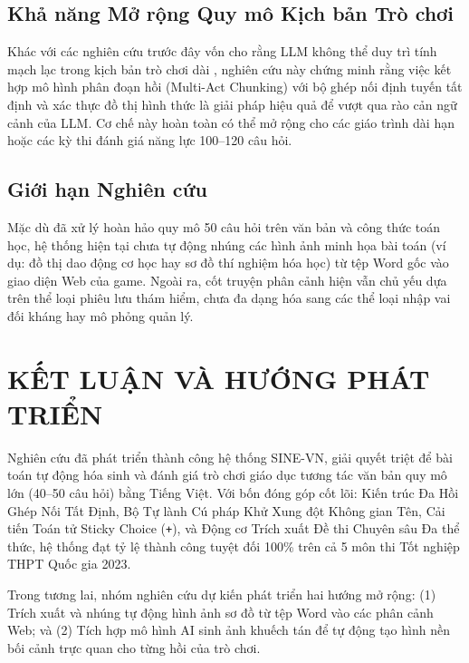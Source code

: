 \documentclass[conference]{IEEEtran}
\begin{document}
\subsection{Khả năng Mở rộng Quy mô Kịch bản Trò chơi}
Khác với các nghiên cứu trước đây vốn cho rằng LLM không thể duy trì tính mạch lạc trong kịch bản trò chơi dài \cite{leandro2024, farrell2025}, nghiên cứu này chứng minh rằng việc kết hợp mô hình phân đoạn hồi (Multi-Act Chunking) với bộ ghép nối định tuyến tất định và xác thực đồ thị hình thức là giải pháp hiệu quả để vượt qua rào cản ngữ cảnh của LLM. Cơ chế này hoàn toàn có thể mở rộng cho các giáo trình dài hạn hoặc các kỳ thi đánh giá năng lực 100--120 câu hỏi.

\subsection{Giới hạn Nghiên cứu}
Mặc dù đã xử lý hoàn hảo quy mô 50 câu hỏi trên văn bản và công thức toán học, hệ thống hiện tại chưa tự động nhúng các hình ảnh minh họa bài toán (ví dụ: đồ thị dao động cơ học hay sơ đồ thí nghiệm hóa học) từ tệp Word gốc vào giao diện Web của game. Ngoài ra, cốt truyện phân cảnh hiện vẫn chủ yếu dựa trên thể loại phiêu lưu thám hiểm, chưa đa dạng hóa sang các thể loại nhập vai đối kháng hay mô phỏng quản lý.

\section{KẾT LUẬN VÀ HƯỚNG PHÁT TRIỂN}
Nghiên cứu đã phát triển thành công hệ thống SINE-VN, giải quyết triệt để bài toán tự động hóa sinh và đánh giá trò chơi giáo dục tương tác văn bản quy mô lớn (40--50 câu hỏi) bằng Tiếng Việt. Với bốn đóng góp cốt lõi: Kiến trúc Đa Hồi Ghép Nối Tất Định, Bộ Tự lành Cú pháp Khử Xung đột Không gian Tên, Cải tiến Toán tử Sticky Choice (\texttt{+}), và Động cơ Trích xuất Đề thi Chuyên sâu Đa thể thức, hệ thống đạt tỷ lệ thành công tuyệt đối 100\% trên cả 5 môn thi Tốt nghiệp THPT Quốc gia 2023.

Trong tương lai, nhóm nghiên cứu dự kiến phát triển hai hướng mở rộng: (1) Trích xuất và nhúng tự động hình ảnh sơ đồ từ tệp Word vào các phân cảnh Web; và (2) Tích hợp mô hình AI sinh ảnh khuếch tán để tự động tạo hình nền bối cảnh trực quan cho từng hồi của trò chơi.
\end{document}
